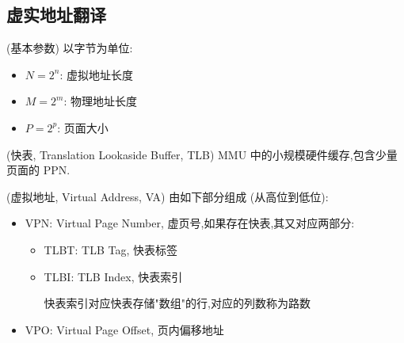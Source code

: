     \subsection{虚实地址翻译}
    \begin{definition}
        (基本参数) 以字节为单位:
        \begin{itemize}
            \item $N=2^{n}$: 虚拟地址长度
            \item $M=2^{m}$: 物理地址长度
            \item $P=2^{p}$: 页面大小
        \end{itemize}
    \end{definition}
    \begin{definition}
        (快表, Translation Lookaside Buffer, TLB) MMU 中的小规模硬件缓存,包含少量页面的 PPN.
    \end{definition}
    \begin{definition}
        (虚拟地址, Virtual Address, VA) 由如下部分组成 (从高位到低位):
        \begin{itemize}
            \item VPN: Virtual Page Number, 虚页号,如果存在快表,其又对应两部分:
            \begin{itemize}
                \item TLBT: TLB Tag, 快表标签
                \item TLBI: TLB Index, 快表索引

                    快表索引对应快表存储"数组"的行,对应的列数称为路数
            \end{itemize}
            \item VPO: Virtual Page Offset, 页内偏移地址
        \end{itemize}
    \end{definition}

